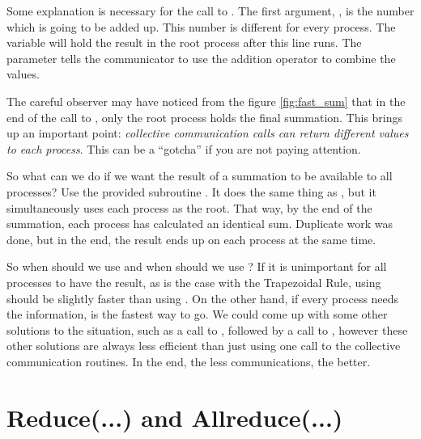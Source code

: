   

  Some explanation is necessary for the call to . The first argument, , is the number which is going to be added up. This number is different for every process. The variable  will hold the result in the root process after this line runs. The parameter  tells the communicator to use the addition operator to combine the values.

  The careful observer may have noticed from the figure \ref{fig:fast_sum} that in the end of the call to , only the root process holds the final summation. This brings up an important point: \emph{collective communication calls can return different values to each process}. This can be a ``gotcha'' if you are not paying attention.

  So what can we do if we want the result of a summation to be available to all processes? Use the provided subroutine . It does the same thing as , but it simultaneously uses each process as the root. That way, by the end of the summation, each process has calculated an identical sum. Duplicate work was done, but in the end, the result ends up on each process at the same time.

  So when should we use  and when should we use ? If it is unimportant for all processes to have the result, as is the case with the Trapezoidal Rule, using  should be slightly faster than using . On the other hand, if every process needs the information,  is the fastest way to go. We could come up with some other solutions to the situation, such as a call to , followed by a call to , however these other solutions are always less efficient than just using one call to the collective communication routines. In the end, the less communications, the better.



\section*{Reduce(...) and Allreduce(...)}

